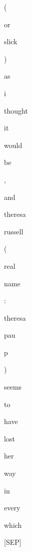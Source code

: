 \documentclass[varwidth=150mm]{standalone}
\begin{document}
\begin{CJK*}{UTF8}{gbsn}
{{{\colorbox{red!14.132038116455078}{\strut (} \colorbox{red!3.3767645359039307}{\strut or} \colorbox{red!2.78338623046875}{\strut slick} \colorbox{red!0.0}{\strut )} \colorbox{red!1.0808136463165283}{\strut as} \colorbox{red!5.3122687339782715}{\strut i} \colorbox{red!1.2956984043121338}{\strut thought} \colorbox{red!3.265993595123291}{\strut it} \colorbox{red!1.3451061248779297}{\strut would} \colorbox{red!0.0}{\strut be} \colorbox{red!0.0}{\strut ,} \colorbox{red!16.952560424804688}{\strut and} \colorbox{red!7.872478008270264}{\strut theresa} \colorbox{red!13.02945327758789}{\strut russell} \colorbox{red!4.2148942947387695}{\strut (} \colorbox{red!4.65040922164917}{\strut real} \colorbox{red!1.7434035539627075}{\strut name} \colorbox{red!2.8038716316223145}{\strut :} \colorbox{red!6.372574329376221}{\strut theresa} \colorbox{red!2.489874839782715}{\strut pau}\colorbox{red!11.51894474029541}{\strut p} \colorbox{red!6.889589309692383}{\strut )} \colorbox{red!15.320250511169434}{\strut seems} \colorbox{red!3.4446160793304443}{\strut to} \colorbox{red!4.477968215942383}{\strut have} \colorbox{red!1.1651713848114014}{\strut lost} \colorbox{red!4.950958728790283}{\strut her} \colorbox{red!1.9796830415725708}{\strut way} \colorbox{red!1.7342889308929443}{\strut in} \colorbox{red!2.574153423309326}{\strut every} \colorbox{red!1.9713774919509888}{\strut which} \colorbox{red!3.2295784950256348}{\strut [SEP]}
}}}
\end{CJK*}
\end{document}
